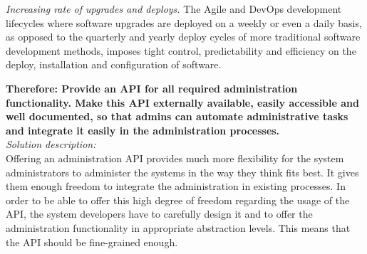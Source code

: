 \textit{Increasing rate of upgrades and deploys.} The Agile and DevOps development lifecycles where software upgrades are deployed on a weekly or even a  daily basis, as opposed to the quarterly and yearly deploy cycles of more traditional software development methods, imposes tight control, predictability and efficiency on the deploy, installation and configuration of software. \cite{Humble2010}
\begin{center}
   
\end{center}

\textbf{Therefore: Provide an API for all required administration functionality. Make this API externally available, easily accessible and well documented, so that admins can automate administrative tasks and integrate it easily in the administration processes.}\\





\textit{Solution description:}\\
Offering an administration API provides much more flexibility for the system administrators to administer the systems in the way they think fits best. It gives them enough freedom to integrate the administration in existing processes. In order to be able to offer this high degree of freedom regarding the usage of the API, the system developers have to carefully design it and to offer the administration functionality in appropriate abstraction levels. This means that the API should be fine-grained enough.

